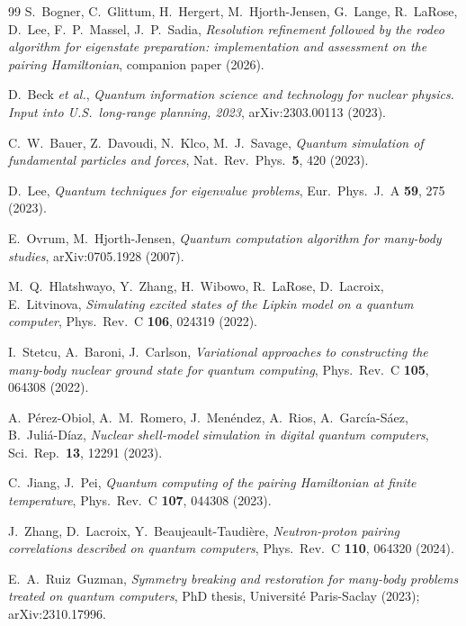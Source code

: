\documentclass[
  aps,            %
  prc,            %
  reprint,        %
  superscriptaddress,
  floatfix,
  nofootinbib
]{revtex4-2}
\begin{document}
\begin{thebibliography}{99}
S.~Bogner, C.~Glittum, H.~Hergert, M.~Hjorth-Jensen, G.~Lange, R.~LaRose,
D.~Lee, F.~P.~Massel, J.~P.~Sadia,
\textit{Resolution refinement followed by the rodeo algorithm for eigenstate
preparation: implementation and assessment on the pairing Hamiltonian},
companion paper (2026).

D.~Beck \textit{et al.},
\textit{Quantum information science and technology for nuclear physics.
Input into U.S.\ long-range planning, 2023},
arXiv:2303.00113 (2023).

C.~W.~Bauer, Z.~Davoudi, N.~Klco, M.~J.~Savage,
\textit{Quantum simulation of fundamental particles and forces},
Nat.\ Rev.\ Phys.\ \textbf{5}, 420 (2023).

D.~Lee,
\textit{Quantum techniques for eigenvalue problems},
Eur.\ Phys.\ J.\ A \textbf{59}, 275 (2023).

E.~Ovrum, M.~Hjorth-Jensen,
\textit{Quantum computation algorithm for many-body studies},
arXiv:0705.1928 (2007).

M.~Q.~Hlatshwayo, Y.~Zhang, H.~Wibowo, R.~LaRose, D.~Lacroix, E.~Litvinova,
\textit{Simulating excited states of the Lipkin model on a quantum computer},
Phys.\ Rev.\ C \textbf{106}, 024319 (2022).

I.~Stetcu, A.~Baroni, J.~Carlson,
\textit{Variational approaches to constructing the many-body nuclear ground state
for quantum computing},
Phys.\ Rev.\ C \textbf{105}, 064308 (2022).

A.~P\'erez-Obiol, A.~M.~Romero, J.~Men\'endez, A.~Rios, A.~Garc\'ia-S\'aez,
B.~Juli\'a-D\'iaz,
\textit{Nuclear shell-model simulation in digital quantum computers},
Sci.\ Rep.\ \textbf{13}, 12291 (2023).

C.~Jiang, J.~Pei,
\textit{Quantum computing of the pairing Hamiltonian at finite temperature},
Phys.\ Rev.\ C \textbf{107}, 044308 (2023).

J.~Zhang, D.~Lacroix, Y.~Beaujeault-Taudi\`ere,
\textit{Neutron-proton pairing correlations described on quantum computers},
Phys.\ Rev.\ C \textbf{110}, 064320 (2024).

E.~A.~Ruiz~Guzman,
\textit{Symmetry breaking and restoration for many-body problems treated on
quantum computers},
PhD thesis, Universit\'e Paris-Saclay (2023); arXiv:2310.17996.


\end{thebibliography}
\end{document}
